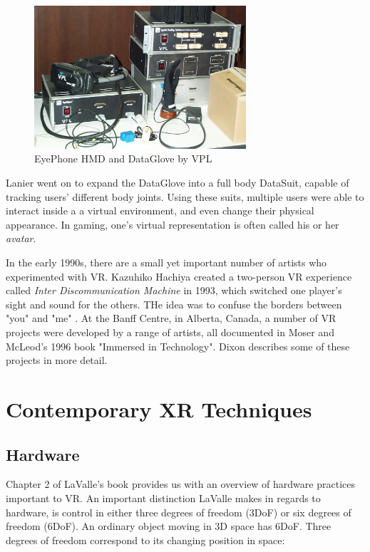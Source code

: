 \begin{figure}[ht!]%
\centering
\includegraphics[width=0.7\textwidth]{img/eyephone-dataglove.jpg} 
\caption{EyePhone HMD and DataGlove by VPL \cite{FileVPLE81online}}
\label{fig:eyephone}
\end{figure}    

Lanier went on to expand the DataGlove into a full body DataSuit, capable of tracking users' different body joints. Using these suits, multiple users were able to interact inside a a virtual environment, and even change their physical appearance. In gaming, one's virtual representation is often called his or her \textit{avatar}.

In the early 1990s, there are a small yet important number of artists who experimented with VR. Kazuhiko Hachiya created a two-person VR experience called \textit{Inter Discommunication Machine} in 1993, which switched one player's sight and sound for the others. THe idea was to confuse the borders between "you" and "me" \cite{dixon2006history}. At the Banff Centre, in Alberta, Canada, a number of VR projects were developed by a range of artists, all documented in Moser and McLeod's 1996 book "Immersed in Technology". Dixon \cite{dixon2006history} describes some of these projects in more detail.

\section{Contemporary XR Techniques}

\subsection{Hardware}

Chapter 2 of LaValle's book \cite{lavalle2016virtual} provides us with an overview of hardware practices important to VR. An important distinction LaValle makes in regards to hardware, is control in either three degrees of freedom (3DoF) or six degrees of freedom (6DoF). An ordinary object moving in 3D space has 6DoF. Three degrees of freedom correspond to its changing position in space: 

